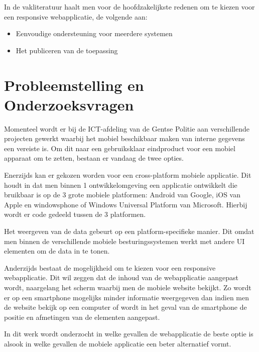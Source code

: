 In de vakliteratuur haalt men voor de hoofdzakelijkste redenen om te kiezen voor een responsive webapplicatie, de volgende aan:
\begin{itemize}
  \item{Eenvoudige ondersteuning voor meerdere systemen}
  \item{Het publiceren van de toepassing}
\end{itemize}



\section{Probleemstelling en Onderzoeksvragen}
\label{sec:onderzoeksvragen}


Momenteel wordt er bij de ICT-afdeling van de Gentse Politie aan verschillende projecten gewerkt waarbij het
mobiel beschikbaar maken van interne gegevens een vereiste is.
Om dit naar een gebruiksklaar eindproduct voor een mobiel apparaat om te zetten, bestaan er vandaag de twee opties.

Enerzijds kan er gekozen worden voor een cross-platform mobiele applicatie.
Dit houdt in dat men binnen 1 ontwikkelomgeving een applicatie ontwikkelt die bruikbaar is op de
3 grote mobiele platformen: Android van Google, iOS van Apple en windowsphone of
Windows Universal Platform van Microsoft.
Hierbij wordt er code gedeeld tussen de 3 platformen.

Het weergeven van de data gebeurt op een platform-specifieke manier.
Dit omdat men binnen de verschillende mobiele besturingssystemen werkt met andere UI elementen om de data in te tonen.

Anderzijds bestaat de mogelijkheid om te kiezen voor een responsive webapplicatie.
Dit wil zeggen dat de inhoud van de webapplicatie aangepast wordt,
 naargelang het scherm waarbij men de mobiele website bekijkt.
Zo wordt er op een smartphone mogelijks minder informatie weergegeven dan indien men de website bekijk op een computer of
wordt in het geval van de smartphone de positie en afmetingen van de elementen aangepast.

In dit werk wordt onderzocht in welke gevallen de webapplicatie de beste optie is alsook in welke gevallen de mobiele applicatie
een beter alternatief vormt.

